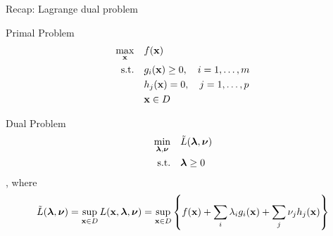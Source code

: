 \documentclass[12pt,notes,mathserif]{beamer}
\begin{document}
\begin{frame}
	{Recap: Lagrange dual problem}
	\begin{block}{Primal Problem}
		\vspace{-1em}
		\begin{equation}
			\begin{aligned}
				\max_{\mathbf{x}}   \quad    & f(\mathbf{x})                            \\
				\textrm{s.t.} \quad & g_i(\mathbf{x}) \ge 0, \quad i=1,\dots,m \\
				                    & h_j(\mathbf{x}) =0 ,\quad j=1,\dots, p   \\
				                    & \mathbf{x} \in D                         \\
			\end{aligned}
		\end{equation}
	\end{block}

	\begin{block}{Dual Problem}
		\vspace{-1em}
		\begin{equation}
			\begin{aligned}
				\min_{\boldsymbol{\lambda}, \boldsymbol{\nu}}   \quad    & \tilde{L}( \boldsymbol{\lambda}, \boldsymbol{\nu}) \\
				\textrm{s.t.} \quad & \boldsymbol{\lambda} \ge 0             \\
			\end{aligned}
		\end{equation}
		, where
		\vspace{-1em}
		\begin{equation*}
			\tilde{L}(\boldsymbol{\lambda}, \boldsymbol{\nu} ) =  \sup_{\mathbf{x} \in D} L(\mathbf{x}, \boldsymbol{\lambda}, \boldsymbol{\nu})
			= \sup_{\mathbf{x} \in D} \left\{ f(\mathbf{x})+  \sum_i \lambda_i g_i(\mathbf{x}) + \sum_j \nu_j h_j(\mathbf{x}) \right\}
		\end{equation*}
	\end{block}
\end{frame}
\end{document}
